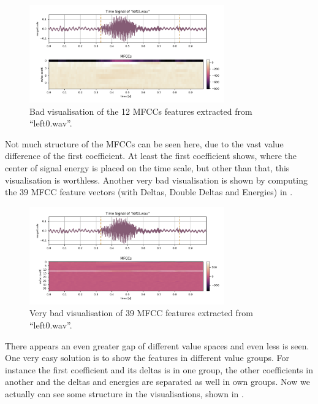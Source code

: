 \begin{figure}[!ht]
  \centering
    \includegraphics[width=0.75\textwidth]{./3_signal/figs/signal_mfcc_left0_mfcc_only.png}
  \caption{Bad visualisation of the 12 MFCCs features extracted from \enquote{left0.wav}.}
  \label{fig:left0_mfcc_only}
\end{figure}
\FloatBarrier
\noindent
Not much structure of the MFCCs can be seen here, due to the vast value difference of the first coefficient. At least the first coefficient shows, where the center of signal energy is placed on the time scale, but other than that, this visualisation is worthless.
Another very bad visualisation is shown by computing the 39 MFCC feature vectors (with Deltas, Double Deltas and Energies) in .

\begin{figure}[!ht]
  \centering
    \includegraphics[width=0.75\textwidth]{./3_signal/figs/signal_mfcc_left0_no_order_norm0.png}
  \caption{Very bad visualisation of 39 MFCC features extracted from \enquote{left0.wav}.}
  \label{fig:left0_no_order}
\end{figure}
\FloatBarrier
\noindent
There appears an even greater gap of different value spaces and even less is seen.
One very easy solution is to show the features in different value groups. For instance the first coefficient and its deltas is in one group, the other coefficients in another and the deltas and energies are separated as well in own groups. Now we actually can see some structure in the visualisations, shown in .

